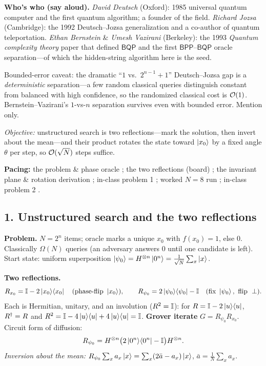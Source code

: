 \documentclass[11pt]{article}
\begin{document}
\begin{board}
\textbf{Who's who (say aloud).} \emph{David Deutsch} (Oxford): 1985 universal quantum
computer and the first quantum algorithm; a founder of the field. \emph{Richard Jozsa}
(Cambridge): the 1992 Deutsch--Jozsa generalization and a co-author of quantum
teleportation. \emph{Ethan Bernstein} \& \emph{Umesh Vazirani} (Berkeley): the 1993
\emph{Quantum complexity theory} paper that defined $\mathsf{BQP}$ and the first
$\mathsf{BPP}$--$\mathsf{BQP}$ oracle separation---of which the hidden-string algorithm
here is the seed.
\end{board}

\begin{advanced}
Bounded-error caveat: the dramatic ``$1$ vs.\ $2^{n-1}+1$'' Deutsch--Jozsa gap is a
\emph{deterministic} separation---a few random classical queries distinguish
constant from balanced with high confidence, so the randomized classical cost is
$\mathcal{O}(1)$. Bernstein--Vazirani's $1$-vs-$n$ separation survives even with bounded
error. Mention only.
\end{advanced}

\noindent\emph{Objective:} unstructured search is two reflections---mark the
solution, then invert about the mean---and their product rotates the state toward
$\ket{x_0}$ by a fixed angle $\theta$ per step, so $\mathcal{O}(\sqrt N)$ steps suffice.

\medskip
\noindent\textbf{Pacing:} the problem \& phase oracle ; the two reflections
(board) ; the invariant plane \& rotation derivation ; in-class
problem 1 ; worked $N=8$ run ; in-class problem 2 .

\subsection*{1. Unstructured search and the two reflections }
\begin{board}
\textbf{Problem.} $N=2^n$ items; oracle marks a unique $x_0$ with $f(x_0)=1$, else
$0$. Classically $\Omega(N)$ queries (an adversary answers $0$ until one candidate
is left). Start state: uniform superposition
$\ket{\psi_0}=H^{\otimes n}\ket{0^n}=\tfrac1{\sqrt N}\sum_x\ket x$.
\end{board}

\begin{board}
\textbf{Two reflections.}
\[
  R_{x_0}=\mathbb{I}-2\ket{x_0}\!\bra{x_0}\quad(\text{phase-flip }\ket{x_0}),\qquad
  R_{\psi_0}=2\ket{\psi_0}\!\bra{\psi_0}-\mathbb{I}\quad(\text{fix }\ket{\psi_0},\text{ flip }\perp).
\]
Each is Hermitian, unitary, and an involution ($R^2=\mathbb{I}$): for $R=\mathbb{I}-2\ket{u}\!\bra{u}$,
$R^{\dagger}=R$ and $R^2=\mathbb{I}-4\ket{u}\!\bra{u}+4\ket{u}\!\bra{u}=\mathbb{I}$. \textbf{Grover iterate}
$G=R_{\psi_0}R_{x_0}$. Circuit form of diffusion:
\[
  R_{\psi_0}=H^{\otimes n}\bigl(2\ket{0^n}\!\bra{0^n}-\mathbb{I}\bigr)H^{\otimes n}.
\]
\emph{Inversion about the mean:} $R_{\psi_0}\sum_x a_x\ket x=\sum_x(2\bar a-a_x)\ket x$,
$\bar a=\tfrac1N\sum_x a_x$.
\end{board}
\end{document}
